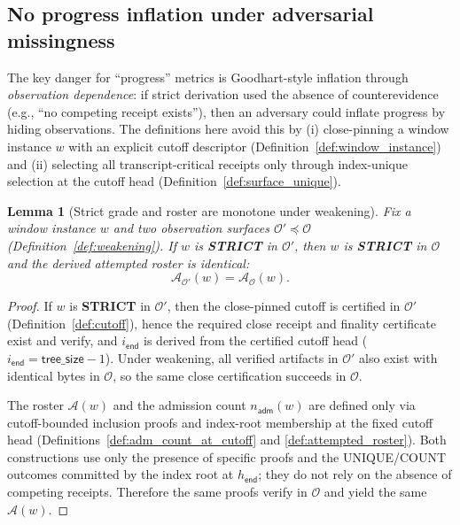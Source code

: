 \documentclass[11pt]{article}
\newcommand{\1}{\mathbf{1}}
\theoremstyle{definition}
\theoremstyle{plain}
\newtheorem{lemma}{Lemma}
\begin{document}
\subsection{No progress inflation under adversarial missingness}
\label{sec:no_inflation}

The key danger for ``progress'' metrics is Goodhart-style inflation through \emph{observation dependence}:
if strict derivation used the absence of counterevidence (e.g., ``no competing receipt exists''), then an adversary could inflate progress by hiding observations.
The definitions here avoid this by (i) close-pinning a window instance $w$ with an explicit cutoff descriptor (Definition~\ref{def:window_instance}) and (ii) selecting all transcript-critical receipts only through index-unique selection at the cutoff head (Definition~\ref{def:surface_unique}).

\begin{lemma}[Strict grade and roster are monotone under weakening]
\label{lem:grade_roster_mono}
Fix a window instance $w$ and two observation surfaces $\mathcal{O}'\preceq\mathcal{O}$ (Definition~\ref{def:weakening}).
If $w$ is \textbf{STRICT} in $\mathcal{O}'$, then $w$ is \textbf{STRICT} in $\mathcal{O}$ and the derived attempted roster is identical:
\[
\mathcal{A}_{\mathcal{O}'}(w)=\mathcal{A}_{\mathcal{O}}(w).
\]
\end{lemma}

\begin{proof}
If $w$ is \textbf{STRICT} in $\mathcal{O}'$, then the close-pinned cutoff is certified in $\mathcal{O}'$ (Definition~\ref{def:cutoff}), hence the required close receipt and finality certificate exist and verify, and $i_{\textsf{end}}$ is derived from the certified cutoff head ($i_{\textsf{end}}=\textsf{tree\_size}-1$).
Under weakening, all verified artifacts in $\mathcal{O}'$ also exist with identical bytes in $\mathcal{O}$, so the same close certification succeeds in $\mathcal{O}$.

The roster $\mathcal{A}(w)$ and the admission count $n_{\textsf{adm}}(w)$ are defined only via cutoff-bounded inclusion proofs and index-root membership at the fixed cutoff head (Definitions~\ref{def:adm_count_at_cutoff} and \ref{def:attempted_roster}).
Both constructions use only the presence of specific proofs and the \textsf{UNIQUE}/\textsf{COUNT} outcomes committed by the index root at $h_{\textsf{end}}$; they do not rely on the absence of competing receipts.
Therefore the same proofs verify in $\mathcal{O}$ and yield the same $\mathcal{A}(w)$.
\end{proof}
\end{document}
